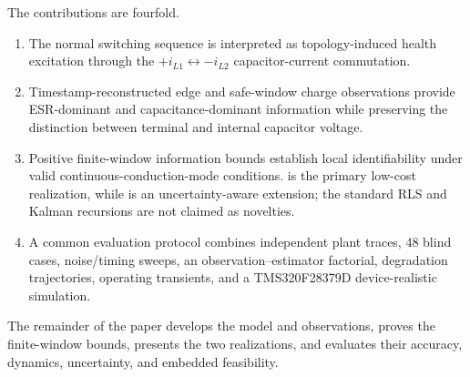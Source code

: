 The contributions are fourfold.
\begin{enumerate}
\item The normal \Cuk{} switching sequence is interpreted as topology-induced health excitation through the $+i_{L1}\leftrightarrow-i_{L2}$ capacitor-current commutation.
\item Timestamp-reconstructed edge and safe-window charge observations provide ESR-dominant and capacitance-dominant information while preserving the distinction between terminal and internal capacitor voltage.
\item Positive finite-window information bounds establish local identifiability under valid continuous-conduction-mode conditions. \TSRLS{} is the primary low-cost realization, while \TSKF{} is an uncertainty-aware extension; the standard RLS and Kalman recursions are not claimed as novelties.
\item A common evaluation protocol combines independent plant traces, 48 blind cases, noise/timing sweeps, an observation--estimator factorial, degradation trajectories, operating transients, and a TMS320F28379D device-realistic simulation.
\end{enumerate}

The remainder of the paper develops the model and observations, proves the finite-window bounds, presents the two realizations, and evaluates their accuracy, dynamics, uncertainty, and embedded feasibility.
